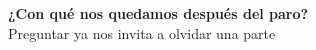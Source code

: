 \documentclass[10pt]{article}
\begin{document}
\begin{titlepage}
\NBG %

\end{titlepage}
\YBG
\color{BckDrac}
{\noindent\large\bfseries ¿Con qué nos quedamos después del paro?\\}
Preguntar ya nos invita a olvidar una parte 
\end{document}
